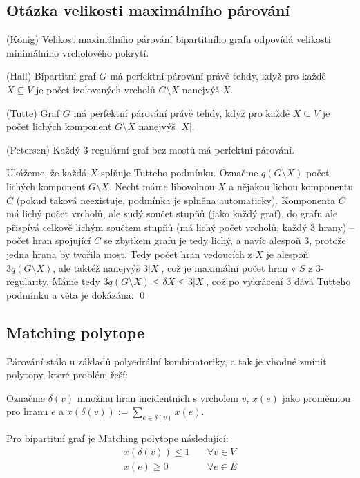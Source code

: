 \subsection{Otázka velikosti maximálního párování}

\vt (König) Velikost maximálního párování bipartitního grafu odpovídá velikosti
minimálního vrcholového pokrytí.

\vt (Hall) Bipartitní graf $G$ má perfektní párování právě tehdy, když pro každé
$X \subseteq V$ je počet izolovaných vrcholů $G \setminus X$ nanejvýš $X$.

\vt (Tutte) Graf $G$ má perfektní párování právě tehdy, když pro každé $X
\subseteq V$ je počet lichých komponent $G \setminus X$ nanejvýš $|X|$.

\vt (Petersen) Každý 3-regulární graf bez mostů má perfektní párování.

\dk Ukážeme, že každá $X$ splňuje Tutteho podmínku. Označme $q(G \setminus X)$
počet lichých komponent $G \setminus X$. Nechť máme libovolnou $X$ a nějakou
lichou komponentu $C$ (pokud taková neexistuje, podmínka je splněna
automaticky).  Komponenta $C$ má lichý počet vrcholů, ale sudý součet stupňů
(jako každý graf), do grafu ale přispívá celkově lichým součtem stupňů (má lichý
počet vrcholů, každý 3 hrany) -- počet hran spojující $C$ se zbytkem grafu je
tedy lichý, a navíc alespoň $3$, protože jedna hrana by tvořila most. Tedy počet
hran vedoucích z $X$ je alespoň $3q(G \setminus X)$, ale taktéž nanejvýš $3|X|$,
což je maximální počet hran v $S$ z $3$-regularity. Máme tedy $3q(G \setminus X)
\leq\delta X \leq 3|X|$, což po vykrácení $3$ dává Tutteho podmínku a věta je
dokázána. \qed


\subsection{Matching polytope}

Párování stálo u základů polyedrální kombinatoriky, a tak je vhodné zmínit
polytopy, které problém řeší:

\df Označme $\delta(v)$ množinu hran incidentních s vrcholem $v$, $x(e)$ jako
proměnnou pro hranu $e$ a $x(\delta(v)) := \sum_{e \in\delta(v)} x(e)$.

\tv Pro bipartitní graf je Matching polytope následující:
\begin{align}
	x(\delta(v)) \leq 1  & \quad  \forall v \in V \\
	x(e) \geq 0 & \quad \forall e  \in E
\end{align}

